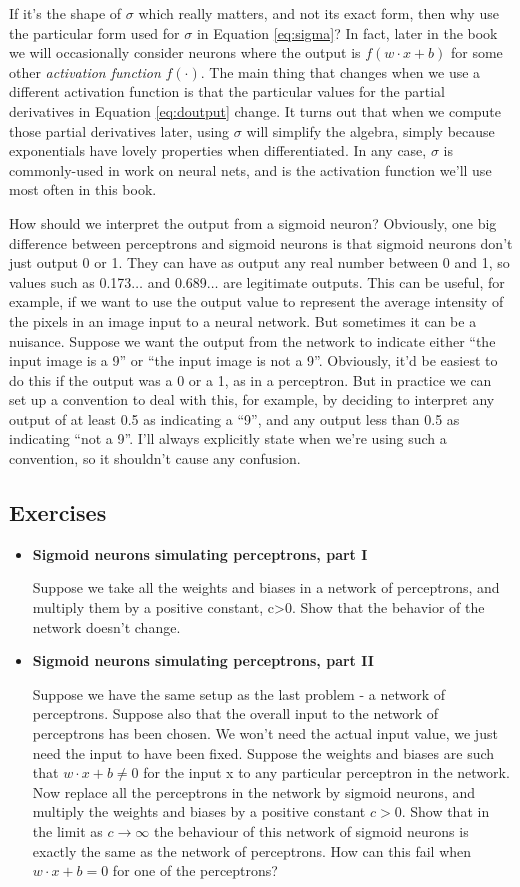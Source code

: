 \documentclass[a4paper,twoside,10pt]{book}
\begin{document}
If it's the shape of $\sigma$ which really matters, and not its exact form, then why use the particular form used for $\sigma$ in Equation \ref{eq:sigma}? In fact, later in the book we will occasionally consider neurons where the output is $f(w\cdot x + b)$ for some other \textit{activation function} $f(\cdot)$. The main thing that changes when we use a different activation function is that the particular values for the partial derivatives in Equation \ref{eq:doutput} change. It turns out that when we compute those partial derivatives later, using $\sigma$ will simplify the algebra, simply because exponentials have lovely properties when differentiated. In any case, $\sigma$ is commonly-used in work on neural nets, and is the activation function we'll use most often in this book.

How should we interpret the output from a sigmoid neuron? Obviously, one big difference between perceptrons and sigmoid neurons is that sigmoid neurons don't just output 0 or 1. They can have as output any real number between 0 and 1, so values such as 0.173$\ldots$ and 0.689$\ldots$ are legitimate outputs. This can be useful, for example, if we want to use the output value to represent the average intensity of the pixels in an image input to a neural network. But sometimes it can be a nuisance. Suppose we want the output from the network to indicate either ``the input image is a 9'' or ``the input image is not a 9''. Obviously, it'd be easiest to do this if the output was a 0 or a 1, as in a perceptron. But in practice we can set up a convention to deal with this, for example, by deciding to interpret any output of at least 0.5 as indicating a ``9'', and any output less than 0.5 as indicating ``not a 9''. I'll always explicitly state when we're using such a convention, so it shouldn't cause any confusion.

\subsection*{Exercises}
\begin{itemize}
\item \textbf{Sigmoid neurons simulating perceptrons, part I}

Suppose we take all the weights and biases in a network of perceptrons, and multiply them by a positive constant, c>0. Show that the behavior of the network doesn't change.

\item \textbf{Sigmoid neurons simulating perceptrons, part II}

Suppose we have the same setup as the last problem - a network of perceptrons. Suppose also that the overall input to the network of perceptrons has been chosen. We won't need the actual input value, we just need the input to have been fixed. Suppose the weights and biases are such that $w\cdot x + b \ne 0$ for the input x to any particular perceptron in the network. Now replace all the perceptrons in the network by sigmoid neurons, and multiply the weights and biases by a positive constant $c>0$. Show that in the limit as $c\to\infty$ the behaviour of this network of sigmoid neurons is exactly the same as the network of perceptrons. How can this fail when $w\cdot x+b=0$ for one of the perceptrons?
\end{itemize}
\end{document}
